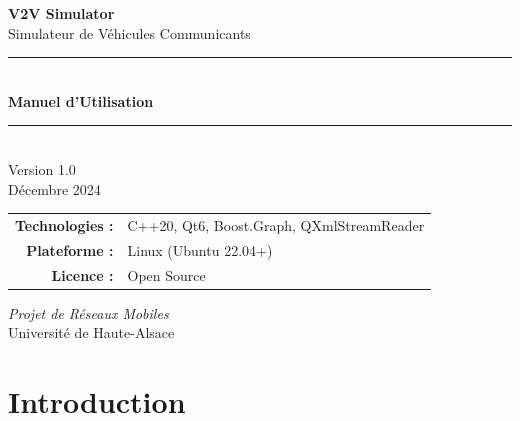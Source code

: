 \documentclass[12pt,a4paper]{article}
\begin{document}
\begin{titlepage}
    \centering
    \vspace*{2cm}
    
    {\Huge\bfseries\textcolor{v2vprimary}{V2V Simulator}}\\[0.5cm]
    {\LARGE\textcolor{v2vsecondary}{Simulateur de Véhicules Communicants}}\\[2cm]
    
    \rule{\linewidth}{1pt}\\[0.5cm]
    {\huge\bfseries Manuel d'Utilisation}\\[0.5cm]
    \rule{\linewidth}{1pt}\\[2cm]
    
    {\Large Version 1.0}\\[0.5cm]
    {\large Décembre 2024}\\[3cm]
    
    \begin{center}
    \begin{tabular}{rl}
        \textbf{Technologies :} & C++20, Qt6, Boost.Graph, QXmlStreamReader \\[0.3cm]
        \textbf{Plateforme :} & Linux (Ubuntu 22.04+) \\[0.3cm]
        \textbf{Licence :} & Open Source \\
    \end{tabular}
    \end{center}
    
    \vfill
    
    {\large\textit{Projet de Réseaux Mobiles}}\\
    {\large Université de Haute-Alsace}
    
\end{titlepage}

\tableofcontents
\newpage

\section{Introduction}
\end{document}
